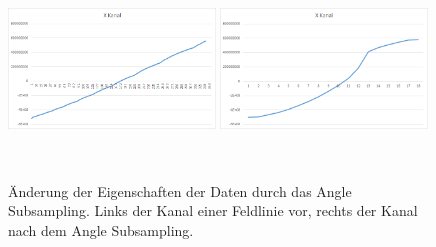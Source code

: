 \begin{figure}[!htbp]
	\center
	\includegraphics[width=0.49\textwidth,height=5cm,keepaspectratio]{./pictures/resultate/loesung2/variante1/channel_sub.png}
	\includegraphics[width=0.49\textwidth,height=5cm,keepaspectratio]{./pictures/resultate/loesung2/variante1/channel_angle.png}
	\caption{Änderung der Eigenschaften der Daten durch das Angle Subsampling. Links der Kanal einer Feldlinie vor, rechts der Kanal nach dem Angle Subsampling.}
	\label{resultate:loesung2:adaptive:channel}
\end{figure}

